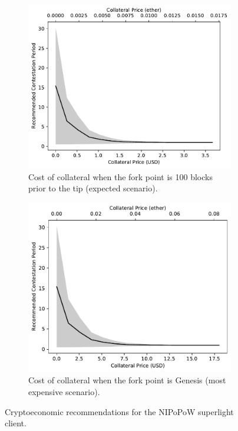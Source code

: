 \begin{figure}[!h]
\begin{subfigure}{0.7\columnwidth}
    \begin{center}
        \includegraphics[width=1\columnwidth]{figures/cryptoeconomics-collateral-100.pdf}
    \end{center}
    \caption{Cost of collateral when the fork point is 100 blocks prior to the
    tip (expected scenario).}
    \label{fig:cryptoeconomics-collateral-100}
\end{subfigure}
\hspace{0.5cm}
\begin{subfigure}{0.7\columnwidth}
    \begin{center}
        \includegraphics[width=1\columnwidth]{figures/cryptoeconomics-collateral-genesis.pdf}
    \end{center}
    \caption{Cost of collateral when the fork point is Genesis (most expensive scenario).}
    \label{fig:cryptoeconomics-collateral-genesis}
\end{subfigure}
\caption{Cryptoeconomic recommendations for the NIPoPoW superlight client.}
\label{fig:cryptoeconomics-collateral}
\end{figure}


